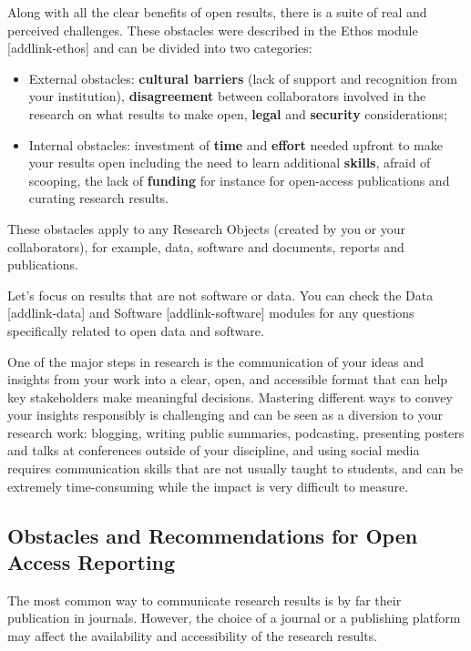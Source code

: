 \documentclass[
  letterpaper,
  DIV=11,
  numbers=noendperiod]{scrreport}
\providecommand{\tightlist}{%
  \setlength{\itemsep}{0pt}\setlength{\parskip}{0pt}}\usepackage{longtable,booktabs,array}
\begin{document}
Along with all the clear benefits of open results, there is a suite of
real and perceived challenges. These obstacles were described in the
Ethos module {[}addlink-ethos{]} and can be divided into two categories:

\begin{itemize}
\tightlist
\item
  External obstacles: \textbf{cultural barriers} (lack of support and
  recognition from your institution), \textbf{disagreement} between
  collaborators involved in the research on what results to make open,
  \textbf{legal} and \textbf{security} considerations;
\item
  Internal obstacles: investment of \textbf{time} and \textbf{effort}
  needed upfront to make your results open including the need to learn
  additional \textbf{skills}, afraid of scooping, the lack of
  \textbf{funding} for instance for open-access publications and
  curating research results.
\end{itemize}

These obstacles apply to any Research Objects (created by you or your
collaborators), for example, data, software and documents, reports and
publications.

Let's focus on results that are not software or data. You can check the
Data {[}addlink-data{]} and Software {[}addlink-software{]} modules for
any questions specifically related to open data and software.

One of the major steps in research is the communication of your ideas
and insights from your work into a clear, open, and accessible format
that can help key stakeholders make meaningful decisions. Mastering
different ways to convey your insights responsibly is challenging and
can be seen as a diversion to your research work: blogging, writing
public summaries, podcasting, presenting posters and talks at
conferences outside of your discipline, and using social media requires
communication skills that are not usually taught to students, and can be
extremely time-consuming while the impact is very difficult to measure.

\hypertarget{obstacles-and-recommendations-for-open-access-reporting}{%
\subsection{Obstacles and Recommendations for Open Access
Reporting}\label{obstacles-and-recommendations-for-open-access-reporting}}

The most common way to communicate research results is by far their
publication in journals. However, the choice of a journal or a
publishing platform may affect the availability and accessibility of the
research results.
\end{document}
